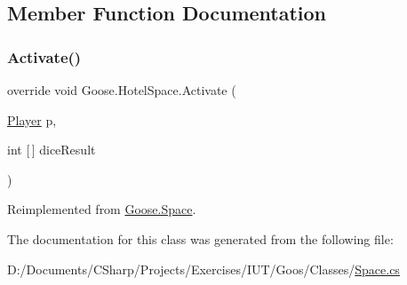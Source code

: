 \subsection{Member Function Documentation}
\mbox{\label{class_goose_1_1_hotel_space_a5db408cc238e50b4a592b557b043d3ee}} 
\subsubsection{\texorpdfstring{Activate()}{Activate()}}
{\footnotesize\ttfamily override void Goose.\+Hotel\+Space.\+Activate (\begin{DoxyParamCaption}\item[{\hyperlink{class_goose_1_1_player}{Player}}]{p,  }\item[{int \mbox{[}$\,$\mbox{]}}]{dice\+Result }\end{DoxyParamCaption})\hspace{0.3cm}{\ttfamily [virtual]}}



Reimplemented from \hyperlink{class_goose_1_1_space_a2c04479a1a06c1a35a6b1d8fb9056c49}{Goose.\+Space}.



The documentation for this class was generated from the following file\+:\begin{DoxyCompactItemize}
\item 
D\+:/\+Documents/\+C\+Sharp/\+Projects/\+Exercises/\+I\+U\+T/\+Goos/\+Classes/\hyperlink{_space_8cs}{Space.\+cs}\end{DoxyCompactItemize}
